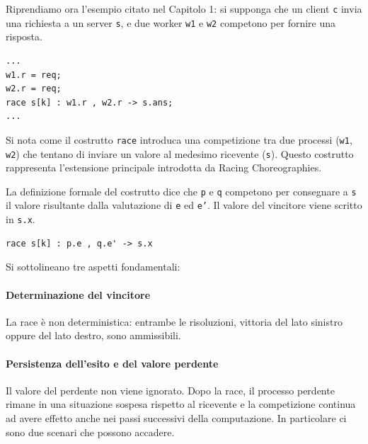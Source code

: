 Riprendiamo ora l’esempio citato nel Capitolo 1: si supponga che un client \texttt{c} invia una richiesta a un server \texttt{s}, e due worker \texttt{w1} e \texttt{w2} competono per fornire una risposta.

\begin{tcolorbox}[
colback=white,
colframe=black!35,
boxrule=0.4pt,
arc=1mm,
left=1.5mm,right=1.5mm,top=0.8mm,bottom=0.8mm
]
\begin{lstlisting}
...
w1.r = req;
w2.r = req;
race s[k] : w1.r , w2.r -> s.ans;
...
\end{lstlisting}
\end{tcolorbox}

Si nota come il costrutto \texttt{race} introduca una competizione tra due processi (\texttt{w1}, \texttt{w2}) che tentano di inviare un valore al medesimo ricevente (\texttt{s}). Questo costrutto rappresenta l’estensione principale introdotta da Racing Choreographies.

La definizione formale del costrutto dice che \texttt{p} e \texttt{q} competono per consegnare a \texttt{s} il valore risultante dalla valutazione di \texttt{e} ed \texttt{e'}. Il valore del vincitore viene scritto in \texttt{s.x}.

\begin{tcolorbox}[
colback=white,
colframe=black!35,
boxrule=0.4pt,
arc=1mm,
left=1.5mm,right=1.5mm,top=0.8mm,bottom=0.8mm
]
\begin{lstlisting}
race s[k] : p.e , q.e' -> s.x
\end{lstlisting}
\end{tcolorbox}

Si sottolineano tre aspetti fondamentali:

\paragraph{Determinazione del vincitore}

La race è non deterministica: entrambe le risoluzioni, vittoria del lato sinistro oppure del lato destro, sono ammissibili.

\paragraph{Persistenza dell’esito e del valore perdente}

Il valore del perdente non viene ignorato. Dopo la race, il processo perdente rimane in una situazione sospesa rispetto al ricevente e la competizione continua ad avere effetto anche nei passi successivi della computazione. In particolare ci sono due scenari che possono accadere.

